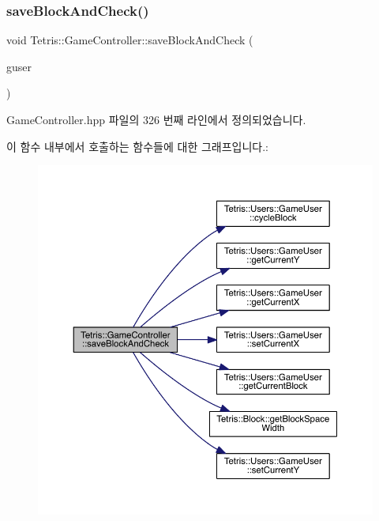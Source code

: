 \subsubsection{\texorpdfstring{save\+Block\+And\+Check()}{saveBlockAndCheck()}\hspace{0.1cm}{\footnotesize\ttfamily [2/2]}}
{\footnotesize\ttfamily void Tetris\+::\+Game\+Controller\+::save\+Block\+And\+Check (\begin{DoxyParamCaption}\item[{\hyperlink{class_tetris_1_1_users_1_1_game_user}{Users\+::\+Game\+User} $\ast$}]{guser }\end{DoxyParamCaption})\hspace{0.3cm}{\ttfamily [inline]}}



Game\+Controller.\+hpp 파일의 326 번째 라인에서 정의되었습니다.

이 함수 내부에서 호출하는 함수들에 대한 그래프입니다.\+:
\nopagebreak
\begin{figure}[H]
\begin{center}
\leavevmode
\includegraphics[width=350pt]{class_tetris_1_1_game_controller_a3c63a9754e4cbeae4f66a5760bb4055d_cgraph}
\end{center}
\end{figure}
\mbox{\label{class_tetris_1_1_game_controller_adc067380df0f0da4ea4a358d00d6a123}} 
